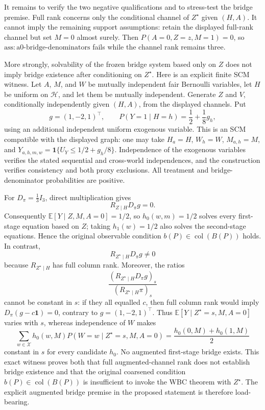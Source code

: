 It remains to verify the two negative qualifications and to stress-test the bridge premise. Full rank concerns only the conditional channel of \(Z^{\star}\) given \((H,A)\). It cannot imply the remaining support assumptions: retain the displayed full-rank channel but set \(M=0\) almost surely. Then \(P(A=0,Z=z,M=1)=0\), so \(\mathrm{ass{:}a0\text{-}bridge\text{-}denominators}\) fails while the channel rank remains three.

More strongly, solvability of the frozen bridge system based only on \(Z\) does not imply bridge existence after conditioning on \(Z^{\star}\). Here is an explicit finite SCM witness. Let \(A\), \(M\), and \(W\) be mutually independent fair Bernoulli variables, let \(H\) be uniform on \(\mathcal H\), and let them be mutually independent. Generate \(Z\) and \(V\), conditionally independently given \((H,A)\), from the displayed channels. Put
\[
 g=(1,-2,1)^{\top},
 \qquad
 P(Y=1\mid H=h)=\frac12+\frac18g_h,
\]
using an additional independent uniform exogenous variable. This is an SCM compatible with the displayed graph: one may take \(H_a=H\), \(W_h=W\), \(M_{a,h}=M\), and \(Y_{a,h,m,w}=\mathbf 1\{U_Y\le 1/2+g_h/8\}\). Independence of the exogenous variables verifies the stated sequential and cross-world independences, and the construction verifies consistency and both proxy exclusions. All treatment and bridge-denominator probabilities are positive.

For \(D_{\pi}=\frac13I_3\), direct multiplication gives
\[
 R_{Z\mid H}D_{\pi}g=0.
\]
Consequently \(\mathbb E[Y\mid Z,M,A=0]=1/2\), so \(h_0(w,m)=1/2\) solves every first-stage equation based on \(Z\); taking \(h_1(w)=1/2\) also solves the second-stage equations. Hence the original observable condition \(b(P)\in\operatorname{col}(B(P))\) holds. In contrast,
\[
 R_{Z^{\star}\mid H}D_{\pi}g\ne0
\]
because \(R_{Z^{\star}\mid H}\) has full column rank. Moreover, the ratios
\[
 \frac{(R_{Z^{\star}\mid H}D_{\pi}g)_s}
 {(R_{Z^{\star}\mid H}\pi)_s}
\]
cannot be constant in \(s\): if they all equalled \(c\), then full column rank would imply \(D_{\pi}(g-c\mathbf 1)=0\), contrary to \(g=(1,-2,1)^{\top}\). Thus \(\mathbb E[Y\mid Z^{\star}=s,M,A=0]\) varies with \(s\), whereas independence of \(W\) makes
\[
 \sum_{w\in\mathcal X}h_0(w,M)P(W=w\mid Z^{\star}=s,M,A=0)
 =\frac{h_0(0,M)+h_0(1,M)}{2}
\]
constant in \(s\) for every candidate \(h_0\). No augmented first-stage bridge exists. This exact witness proves both that full augmented-channel rank does not establish bridge existence and that the original coarsened condition \(b(P)\in\operatorname{col}(B(P))\) is insufficient to invoke the WBC theorem with \(Z^{\star}\). The explicit augmented bridge premise in the proposed statement is therefore load-bearing.